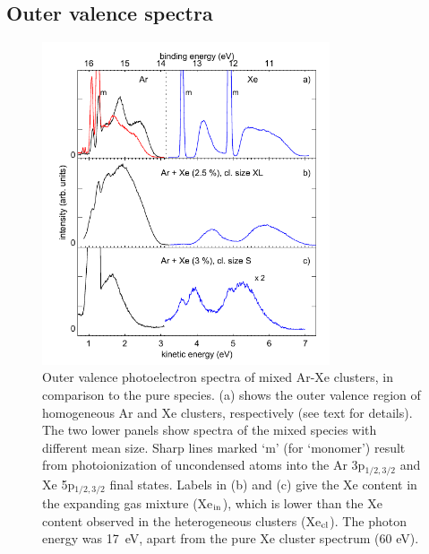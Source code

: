 \subsection{Outer valence spectra}
%
\begin{figure}[ht]
 \centering
 \includegraphics[width=8.5cm]{pics/figure_oval_1.pdf}
 \caption{
Outer valence photoelectron spectra of mixed Ar-Xe clusters, in comparison to the pure species. 
(a) shows the outer valence region of homogeneous Ar and Xe clusters, respectively (see text for details). 
The two lower panels show spectra of the mixed species with different mean size. 
Sharp lines marked `m' (for `monomer') result from photoionization of uncondensed atoms into the Ar 3p$_{1/2,3/2}$ and Xe 5p$_{1/2,3/2}$ final states. 
Labels in (b) and (c) give the Xe content in the expanding gas mixture (Xe$_{\rm in}$), which is lower than the Xe content observed in the heterogeneous clusters (Xe$_{\rm cl}$). 
The photon energy was 17~eV, apart from the pure Xe cluster spectrum (60 eV).
}
 \label{figure:oval1}
\end{figure}


